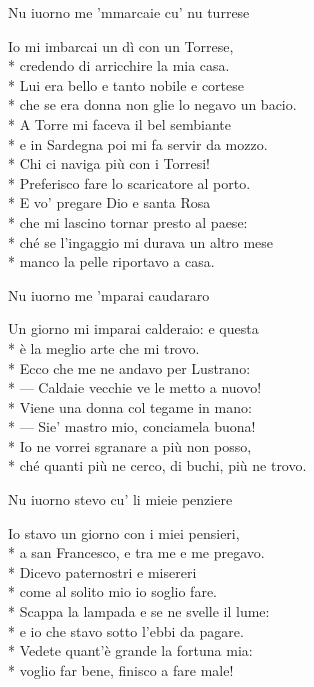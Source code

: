 \documentclass[11pt]{book}
\begin{document}
\begin{poem}{Nu iuorno me ’mmarcaie cu’ nu turrese}{}
\settowidth{\versewidth}{Che se era donna non glie lo negavo un bacio}
\begin{altverse}
Io mi imbarcai un dì con un Torrese,\\*
credendo di arricchire la mia casa.\\*
Lui era bello e tanto nobile e cortese\\*
che se era donna non glie lo negavo un bacio.\\*
A Torre mi faceva il bel sembiante\\*
e in Sardegna poi mi fa servir da mozzo.\\*
Chi ci naviga più con i Torresi!\\*
Preferisco fare lo scaricatore al porto.\\*
E vo’ pregare Dio e santa Rosa\\*
che mi lascino tornar presto al paese:\\*
ché se l’ingaggio mi durava un altro mese\\*
manco la pelle riportavo a casa.
\end{altverse}
\end{poem}

\begin{poem}{Nu iuorno me ’mparai caudararo}{}
\settowidth{\versewidth}{Ché quanti più ne cerco, di buchi, più ne trovo}
\begin{altverse}
Un giorno mi imparai calderaio: e questa\\*
è la meglio arte che mi trovo.\\*
Ecco che me ne andavo per Lustrano:\\*
— Caldaie vecchie ve le metto a nuovo!\\*
Viene una donna col tegame in mano:\\*
— Sie’ mastro mio, conciamela buona!\\*
Io ne vorrei sgranare a più non posso,\\*
ché quanti più ne cerco, di buchi, più ne trovo.
\end{altverse}
\end{poem}

\begin{poem}{Nu iuorno stevo cu’ li mieie penziere}{}
\settowidth{\versewidth}{Scappa la lampada e se ne svelle il lume}
\begin{altverse}
Io stavo un giorno con i miei pensieri,\\*
a san Francesco, e tra me e me pregavo.\\*
Dicevo paternostri e misereri\\*
come al solito mio io soglio fare.\\*
Scappa la lampada e se ne svelle il lume:\\*
e io che stavo sotto l’ebbi da pagare.\\*
Vedete quant’è grande la fortuna mia:\\*
voglio far bene, finisco a fare male!
\end{altverse}
\end{poem}
\end{document}
